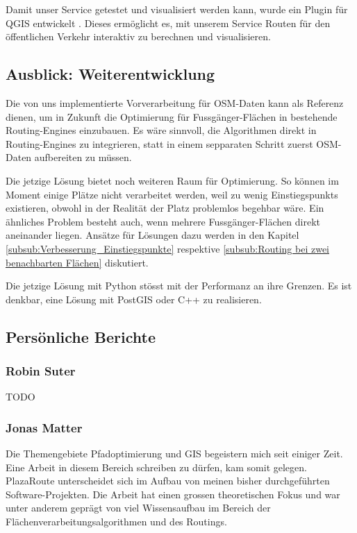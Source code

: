 Damit unser Service getestet und visualisiert werden kann, wurde ein Plugin für QGIS entwickelt \cite{github:PlazaRoute-qgis-plugin}. Dieses ermöglicht es, mit unserem Service Routen für den öffentlichen Verkehr interaktiv zu berechnen und visualisieren.

\subsection{Ausblick: Weiterentwicklung}
\label{sub:Ausblick: Weiterentwicklung}

Die von uns implementierte Vorverarbeitung für \ac{OSM}-Daten kann als Referenz dienen, um in Zukunft die Optimierung für Fussgänger-Flächen in bestehende Routing-Engines einzubauen. Es wäre sinnvoll, die Algorithmen direkt in Routing-Engines zu integrieren, statt in einem sepparaten Schritt zuerst \ac{OSM}-Daten aufbereiten zu müssen.

Die jetzige Lösung bietet noch weiteren Raum für Optimierung. So können im Moment einige Plätze nicht verarbeitet werden, weil zu wenig \glspl{Einstiegspunkt} existieren, obwohl in der Realität der Platz problemlos begehbar wäre. Ein ähnliches Problem besteht auch, wenn mehrere Fussgänger-Flächen direkt aneinander liegen. Ansätze für Lösungen dazu werden in den Kapitel \ref{subsub:Verbesserung_Einstiegspunkte} respektive \ref{subsub:Routing bei zwei benachbarten Flächen} diskutiert.

Die jetzige Lösung mit Python stösst mit der Performanz an ihre Grenzen. Es ist denkbar, eine Lösung mit PostGIS oder C++ zu realisieren.

\subsection{Persönliche Berichte}
\label{sub:Persönliche Berichte}

\subsubsection{Robin Suter}
\label{Persönliche Berichte:Robin Suter}
TODO

\subsubsection{Jonas Matter}
\label{Persönliche Berichte:Jonas Matter}
Die Themengebiete Pfadoptimierung und \ac{GIS} begeistern mich seit einiger Zeit. Eine Arbeit in diesem Bereich schreiben zu dürfen, kam somit gelegen. PlazaRoute unterscheidet sich im Aufbau von meinen bisher durchgeführten Software-Projekten. Die Arbeit hat einen grossen theoretischen Fokus und war unter anderem geprägt von viel Wissensaufbau im Bereich der Flächenverarbeitungsalgorithmen und des Routings. 

